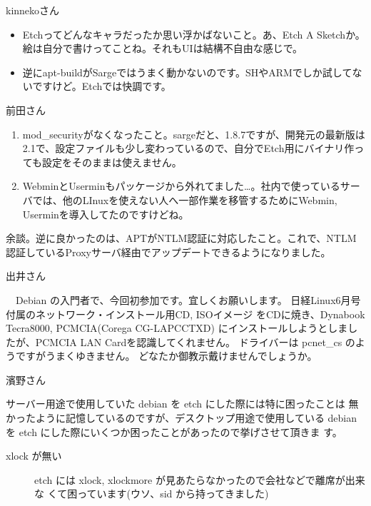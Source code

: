 \documentclass[cjk,dvipdfmx,12pt]{beamer}
\begin{document}
\begin{frame}{kinnekoさん}
\begin{itemize}

 \item Etchってどんなキャラだったか思い浮かばないこと。あ、Etch A Sketchか。絵は自分で書けってことね。それもUIは結構不自由な感じで。

 \item 逆にapt-buildがSargeではうまく動かないのです。SHやARMでしか試してないですけど。Etchでは快調です。
\end{itemize}


\end{frame}\begin{frame}{前田さん}

\begin{enumerate}
 \item  mod\_{}securityがなくなったこと。sargeだと、1.8.7ですが、開発元の最新版は2.1で、設定ファイルも少し変わっているので、自分でEtch用にバイナリ作っても設定をそのままは使えません。
 \item WebminとUserminもパッケージから外れてました…。社内で使っているサーバでは、他のLInuxを使えない人へ一部作業を移管するためにWebmin,
 Userminを導入してたのですけどね。
\end{enumerate}

余談。逆に良かったのは、APTがNTLM認証に対応したこと。これで、NTLM認証しているProxyサーバ経由でアップデートできるようになりました。

\end{frame}\begin{frame}{出井さん}

　Debian の入門者で、今回初参加です。宜しくお願いします。
日経Linux6月号付属のネットワーク・インストール用CD, ISOイメージ
をCDに焼き、Dynabook Tecra8000, PCMCIA(Corega CG-LAPCCTXD)
にインストールしようとしましたが、PCMCIA LAN Cardを認識してくれません。
ドライバーは pcnet\_{}cs のようですがうまくゆきません。
どなたか御教示戴けませんでしょうか。

\end{frame}\begin{frame}{濱野さん}

サーバー用途で使用していた debian を etch にした際には特に困ったことは
無かったように記憶しているのですが、デスクトップ用途で使用している
debian を etch にした際にいくつか困ったことがあったので挙げさせて頂きま
す。

\begin{description}
 \item[xlock が無い]
 etch には xlock, xlockmore が見あたらなかったので会社などで離席が出来な
 くて困っています(ウソ、sid から持ってきました)


\end{description}
\end{frame}
\end{document}
